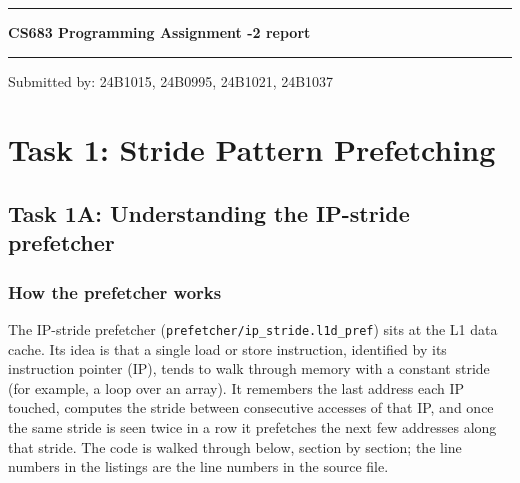 \documentclass[11pt,a4paper]{article}
\begin{document}
\begin{titlepage}
    \thispagestyle{empty}
    \centering
    \vspace*{0.28\textheight}
    {\color{accent}\rule{0.8\textwidth}{1.2pt}\par}
    \vspace{1.0cm}
    {\fontsize{21}{26}\selectfont\bfseries\color{accent} CS683 Programming Assignment -2 report\par}
    \vspace{1.0cm}
    {\color{accent}\rule{0.8\textwidth}{1.2pt}\par}
    \vspace{1.4cm}
    {\large Submitted by: 24B1015, 24B0995, 24B1021, 24B1037\par}
    \vfill
\end{titlepage}

\section{Task 1: Stride Pattern Prefetching}

\subsection{Task 1A: Understanding the IP-stride prefetcher}
\label{sec:task1a}

\subsubsection{How the prefetcher works}

The IP-stride prefetcher (\texttt{prefetcher/ip\_stride.l1d\_pref}) sits at the L1 data
cache. Its idea is that a single load or store instruction, identified by its instruction
pointer (IP), tends to walk through memory with a constant stride (for example, a loop
over an array). It remembers the last address each IP touched, computes the stride between
consecutive accesses of that IP, and once the same stride is seen twice in a row it
prefetches the next few addresses along that stride. The code is walked through below,
section by section; the line numbers in the listings are the line numbers in the source file.
\end{document}

